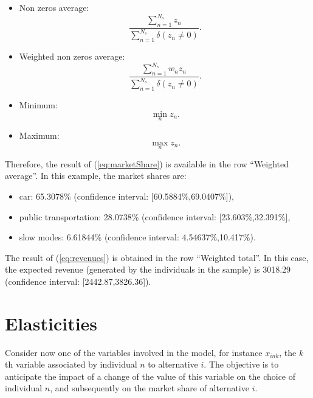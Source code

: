 \documentclass[12pt,a4paper]{article}
\newcommand{\req}[1]{(\ref{#1})}
\begin{document}
\begin{itemize}
\begin{itemize}
\begin{equation}
\begin{array}{ll}
          1 & \text{if } z_n \neq 0, \\
          0 & \text{otherwise}.
        \end{array}
        \right.
      \end{equation}
    \item Non zeros average:
      \begin{equation}
\frac{\sum_{n=1}^{N_s} z_n}{ \sum_{n=1}^{N_s} \delta(z_n \neq 0)}.
      \end{equation}
    \item Weighted non zeros average:
      \begin{equation}
\frac{\sum_{n=1}^{N_s} w_n z_n }{ \sum_{n=1}^{N_s} \delta(z_n \neq 0)}.
      \end{equation}
    \item Minimum:
      \begin{equation}
\min_n z_n.
      \end{equation}
    \item Maximum:
      \begin{equation}
\max_n z_n.
      \end{equation}
    \end{itemize}
\end{itemize}

Therefore, the result of \req{eq:marketShare} is available in the
row ``Weighted average''. In this example, the market shares are:
\begin{itemize}
\item car: 65.3078\% (confidence interval: [60.5884\%,69.0407\%]),
  \item public transportation: 28.0738\% (confidence interval:
    [23.603\%,32.391\%],
    \item slow modes: 6.61844\% (confidence interval:
      4.54637\%,10.417\%).
\end{itemize}
The result of \req{eq:revenues} is obtained in the row ``Weighted
total''. In this case, the expected revenue (generated by the
individuals in the sample) is 3018.29 (confidence interval: [2442.87,3826.36]).

\section{Elasticities}
\label{sec:elasticities}
Consider now one of the variables involved in the model, for instance
$x_{ink}$, the $k$th variable associated by individual $n$ to
alternative $i$. The
objective is to anticipate the impact of a change of the value of this
variable on the choice of individual $n$,  and subsequently on the market share of
alternative $i$.
\end{document}
